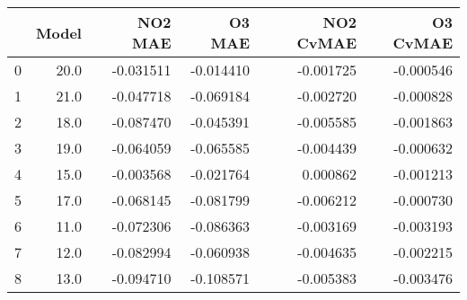 \begin{tabular}{lrrrrr}
\toprule
{} &  Model &   NO2 MAE &    O3 MAE &  NO2 CvMAE &  O3 CvMAE \\
\midrule
0 &   20.0 & -0.031511 & -0.014410 &  -0.001725 & -0.000546 \\
1 &   21.0 & -0.047718 & -0.069184 &  -0.002720 & -0.000828 \\
2 &   18.0 & -0.087470 & -0.045391 &  -0.005585 & -0.001863 \\
3 &   19.0 & -0.064059 & -0.065585 &  -0.004439 & -0.000632 \\
4 &   15.0 & -0.003568 & -0.021764 &   0.000862 & -0.001213 \\
5 &   17.0 & -0.068145 & -0.081799 &  -0.006212 & -0.000730 \\
6 &   11.0 & -0.072306 & -0.086363 &  -0.003169 & -0.003193 \\
7 &   12.0 & -0.082994 & -0.060938 &  -0.004635 & -0.002215 \\
8 &   13.0 & -0.094710 & -0.108571 &  -0.005383 & -0.003476 \\
\bottomrule
\end{tabular}
